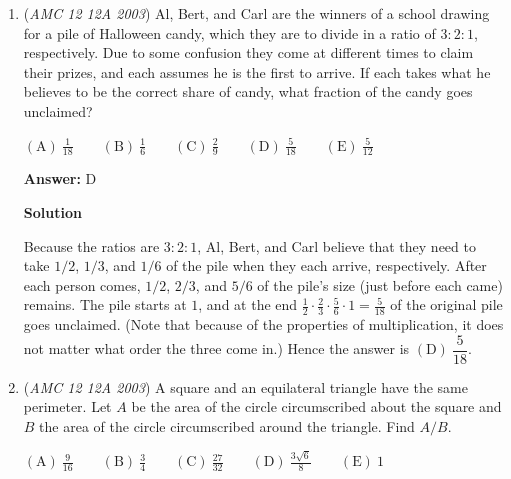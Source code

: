 \begin{enumerate}
 \textbf{Answer: }D



\textbf{Solution}

If $(2,3)$ is in $S$, then its reflection in the line $y = x$, i.e. $(3,2)$, is also in $S$. Now by reflecting these points in both coordinate axes, we quickly deduce that every point of the form $(\pm 2, \pm 3)$ or $(\pm 3, \pm 2)$ must be in $S$. Moreover, by drawing out this set of $8$ points, we observe that it satisfies all of the required symmetry conditions, so no more points need to be added to $S$. Accordingly, the smallest possible number of points in $S$ is precisely $\boxed{\mathrm{(D)}\ 8}$.

 


	\item (\textit{AMC 12 12A 2003}) Al, Bert, and Carl are the winners of a school drawing for a pile of Halloween candy, which they are to divide in a ratio of $3:2:1$, respectively. Due to some confusion they come at different times to claim their prizes, and each assumes he is the first to arrive. If each takes what he believes to be the correct share of candy, what fraction of the candy goes unclaimed?


 $\mathrm{(A) \ } \frac{1}{18}\qquad \mathrm{(B) \ } \frac{1}{6}\qquad \mathrm{(C) \ } \frac{2}{9}\qquad \mathrm{(D) \ } \frac{5}{18}\qquad \mathrm{(E) \ } \frac{5}{12}$

 \textbf{Answer: }D



\textbf{Solution}

Because the ratios are $3:2:1$, Al, Bert, and Carl believe that they need to take $1/2$, $1/3$, and $1/6$ of the pile when they each arrive, respectively. After each person comes, $1/2$, $2/3$, and $5/6$ of the pile's size (just before each came) remains. The pile starts at $1$, and at the end $\frac{1}{2}\cdot \frac{2}{3}\cdot \frac{5}{6}\cdot 1 = \frac{5}{18}$ of the original pile goes unclaimed. (Note that because of the properties of multiplication, it does not matter what order the three come in.) Hence the answer is $\boxed{\mathrm{(D)}\ \dfrac{5}{18}}$.

 


	\item (\textit{AMC 12 12A 2003}) A square and an equilateral triangle have the same perimeter. Let $A$ be the area of the circle circumscribed about the square and $B$ the area of the circle circumscribed around the triangle. Find $A/B$.


 $\mathrm{(A) \ } \frac{9}{16}\qquad \mathrm{(B) \ } \frac{3}{4}\qquad \mathrm{(C) \ } \frac{27}{32}\qquad \mathrm{(D) \ } \frac{3\sqrt{6}}{8}\qquad \mathrm{(E) \ } 1$


\end{enumerate}
